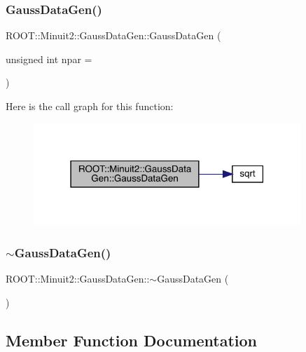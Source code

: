 \subsubsection{\texorpdfstring{GaussDataGen()}{GaussDataGen()}}
{\footnotesize\ttfamily R\+O\+O\+T\+::\+Minuit2\+::\+Gauss\+Data\+Gen\+::\+Gauss\+Data\+Gen (\begin{DoxyParamCaption}\item[{unsigned int}]{npar = {} }\end{DoxyParamCaption})}

Here is the call graph for this function\+:\nopagebreak
\begin{figure}[H]
\begin{center}
\leavevmode
\includegraphics[width=286pt]{d8/d75/classROOT_1_1Minuit2_1_1GaussDataGen_a9d4852a18f8d4f261ea60f5b2abeee4d_cgraph}
\end{center}
\end{figure}
\mbox{\label{classROOT_1_1Minuit2_1_1GaussDataGen_ab35aa0205949603dbe8731c6d47e79f0}} 
\subsubsection{\texorpdfstring{$\sim$GaussDataGen()}{~GaussDataGen()}}
{\footnotesize\ttfamily R\+O\+O\+T\+::\+Minuit2\+::\+Gauss\+Data\+Gen\+::$\sim$\+Gauss\+Data\+Gen (\begin{DoxyParamCaption}{ }\end{DoxyParamCaption})\hspace{0.3cm}{\ttfamily [inline]}}



\subsection{Member Function Documentation}
\mbox{\label{classROOT_1_1Minuit2_1_1GaussDataGen_aa943fffb99444ab2b72198f36b906f71}} 
